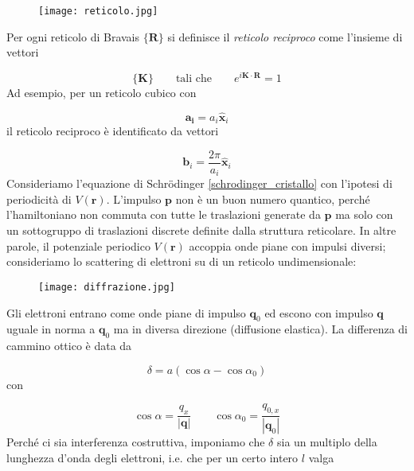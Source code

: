 \documentclass[a4paper]{report}
\begin{document}
\begin{figure}[h]
    \centering
    \texttt{[image: reticolo.jpg]}
\end{figure}

\newpage

Per ogni reticolo di Bravais $\{\mathbf{R}\}$ si definisce il \textit{reticolo reciproco} come l'insieme di vettori

\begin{equation}
    \{\mathbf{K}\} \qquad \text{tali che}\qquad e^{i\mathbf{K}\cdot \mathbf{R}} = 1
\end{equation}
Ad esempio, per un reticolo cubico con

\begin{equation}
    \mathbf{a_i} = a_i \hat{\mathbf{x}}_i
\end{equation}
il reticolo reciproco è identificato da vettori

\begin{equation}
    \mathbf{b}_i = \frac{2\pi}{a_i} \hat{\mathbf{x}}_i
\end{equation}
Consideriamo l'equazione di Schr\"odinger \eqref{schrodinger_cristallo} con l'ipotesi di periodicità di $V(\mathbf{r})$. L'impulso $\mathbf{p}$ non è un buon numero quantico, perché l'hamiltoniano non commuta con tutte le traslazioni generate da $\mathbf{p}$ ma solo con un sottogruppo di traslazioni discrete definite dalla struttura reticolare. In altre parole, il potenziale periodico $V(\mathbf{r})$ accoppia onde piane con impulsi diversi; consideriamo lo scattering di elettroni su di un reticolo undimensionale:

\begin{figure}[h]
    \centering
    \texttt{[image: diffrazione.jpg]}
\end{figure}
Gli elettroni entrano come onde piane di impulso $\mathbf{q}_0$ ed escono con impulso $\mathbf{q}$ uguale in norma a $\mathbf{q}_0$ ma in diversa direzione (diffusione elastica). La differenza di cammino ottico è data da

\begin{equation}
    \delta = a (\cos\alpha - \cos\alpha_0)
\end{equation}
con

\begin{equation}
    \cos \alpha = \frac{q_x}{|\mathbf{q}|}\qquad \cos\alpha_0 = \frac{q_{0,x}}{|\mathbf{q}_0|}
\end{equation}
Perché ci sia interferenza costruttiva, imponiamo che $\delta$ sia un multiplo della lunghezza d'onda degli elettroni, i.e. che per un certo intero $l$ valga
\end{document}

